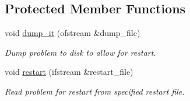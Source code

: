 \subsection*{Protected Member Functions}
\begin{DoxyCompactItemize}
\item 
void \hyperlink{classFSICollapsibleChannelProblem_a2a947a11c11090b39d2bc4439fb96e36}{dump\+\_\+it} (ofstream \&dump\+\_\+file)
\begin{DoxyCompactList}\small\item\em Dump problem to disk to allow for restart. \end{DoxyCompactList}\item 
void \hyperlink{classFSICollapsibleChannelProblem_a2ee280c8cccc90baae4b0b6744be9efe}{restart} (ifstream \&restart\+\_\+file)
\begin{DoxyCompactList}\small\item\em Read problem for restart from specified restart file. \end{DoxyCompactList}\end{DoxyCompactItemize}
